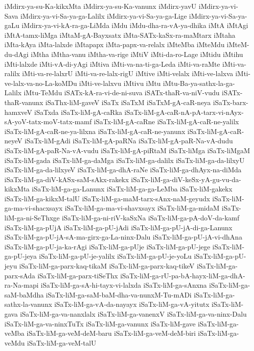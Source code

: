 {iMdirx-ya-su-Ka-kikxMta
iMdirx-ya-su-Ka-vanunx
iMdirx-yavU
iMdirx-ya-vi-Sava
iMdirx-ya-vi-Sa-ya-ga-Lalilx
iMdirx-ya-vi-Sa-ya-ga-Lige
iMdirx-ya-vi-Sa-ya-gaLu
iMdirx-ya-vi-kA-ra-ga-LiMda
iMdu
iMdu-dha-ra-vA-ya-dhika
iMtA
iMtAgi
iMtA-tamx-liMga
iMtaM-gA-Bayxsatx
iMta-SATx-kaSx-ra-maMtarx
iMtaha
iMta-kAya
iMta-lalxde
iMtapapx
iMta-papx-va-relalx
iMteMba
iMteMdu
iMteM-du-dAgi
iMtha
iMtha-vanu
iMtha-va-rige
iMtiV
iMti-da-ro-Lage
iMtidu
iMtihu
iMti-lalxde
iMti-vA-di-yAgi
iMtiva
iMti-va-na-ti-ga-Leda
iMti-va-raMte
iMti-va-ralilx
iMti-va-re-lalxrU
iMti-va-re-lalx-rigU
iMtive
iMti-velalx
iMti-ve-lalxva
iMti-ve-lalx-va-no-La-koMDu
iMti-ve-lalxvu
iMtivu
iMtu
iMtu-Ba-ya-sathx-la-ga-Lalilx
iMtu-TeMdu
iSATx-kA-ra-vi-de-ni-suva
iSATx-thaR-va-niV-vudu
iSATx-thaR-vanunx
iSaThx-liM-gaveV
iSaTx
iSaTxM
iSaTxM-gA-caR-neya
iSaTx-barx-hamxveV
iSaTxda
iSaTx-liM-gA-caRka
iSaTx-liM-gA-caR-nA-pA-tarx-vi-nAyx-sA-yoV-tatx-moV-tatx-mamf
iSaTx-liM-gA-caRne
iSaTx-liM-gA-caR-ne-yalilx
iSaTx-liM-gA-caR-ne-ya-lilxna
iSaTx-liM-gA-caR-ne-yanunx
iSaTx-liM-gA-caR-neyeV
iSaTx-liM-gAdi
iSaTx-liM-gA-paRNa
iSaTx-liM-gA-paR-Na-vA-dudu
iSaTx-liM-gA-paR-Na-vA-vudu
iSaTx-liM-gA-piRtaM
iSaTx-liMga
iSaTx-liMgaM
iSaTx-liM-gada
iSaTx-liM-ga-daMga
iSaTx-liM-ga-dalilx
iSaTx-liM-ga-da-lilxyU
iSaTx-liM-ga-da-lilxyeV
iSaTx-liM-ga-dhA-raNe
iSaTx-liM-ga-dhAyx-na-diMda
iSaTx-liM-ga-diV-kASx-saM-sAkx-rakekx
iSaTx-liM-ga-diV-keSx-yA-gu-vu-da-kikxMta
iSaTx-liM-ga-ga-Lanunx
iSaTx-liM-ga-ga-LeMba
iSaTx-liM-gakekx
iSaTx-liM-ga-kikxM-talU
iSaTx-liM-ga-maM-tarx-sAnx-naM-geyudx
iSaTx-liM-ga-ma-vi-shacxsayx
iSaTx-liM-ga-ma-vi-shavxsayx
iSaTx-liM-ga-midaM
iSaTx-liM-ga-ni-SeThxge
iSaTx-liM-ga-ni-riV-kaSxNa
iSaTx-liM-ga-pA-doV-da-kamf
iSaTx-liM-ga-pUjA
iSaTx-liM-ga-pU-jAdi
iSaTx-liM-ga-pU-jA-di-ga-Lanunx
iSaTx-liM-ga-pU-jA-sA-ma-girx-ga-La-ninx-Dalu
iSaTx-liM-ga-pU-jA-vi-dhAna
iSaTx-liM-ga-pU-ja-ka-rAgi
iSaTx-liM-ga-pUje
iSaTx-liM-ga-pU-jege
iSaTx-liM-ga-pU-jeya
iSaTx-liM-ga-pU-je-yalilx
iSaTx-liM-ga-pU-je-yoLu
iSaTx-liM-ga-pU-jeyu
iSaTx-liM-ga-parx-kaq-tikaM
iSaTx-liM-ga-parx-kaq-tikeV
iSaTx-liM-ga-parx-sAda
iSaTx-liM-ga-parx-tiSeThx
iSaTx-liM-ga-rU-pa-bA-hayx-liM-ga-dhA-ra-Na-mapi
iSaTx-liM-ga-sA-hi-tayx-vi-lalxda
iSaTx-liM-ga-sAnxna
iSaTx-liM-ga-saM-baMdha
iSaTx-liM-ga-saM-baM-dha-va-nunxM-Tu-mADi
iSaTx-liM-ga-sathx-la-vanunx
iSaTx-liM-ga-vA-da-nayayx
iSaTx-liM-ga-vA-yitutx
iSaTx-liM-gava
iSaTx-liM-ga-va-nanxlalx
iSaTx-liM-ga-vanenxV
iSaTx-liM-ga-va-ninx-Dalu
iSaTx-liM-ga-va-ninxTuTx
iSaTx-liM-ga-vanunx
iSaTx-liM-gave
iSaTx-liM-ga-veMba
iSaTx-liM-ga-veM-deM-baru
iSaTx-liM-ga-veM-deM-biri
iSaTx-liM-ga-veMdu
iSaTx-liM-ga-veM-talU
}
